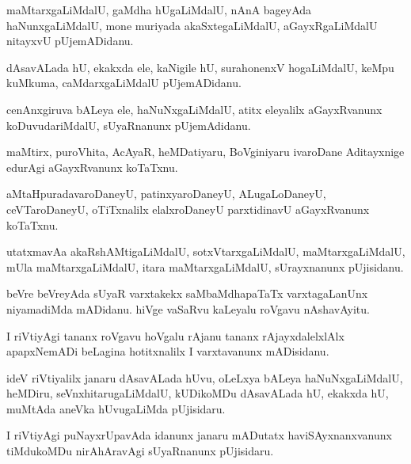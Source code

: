 \documentclass{article}
\begin{document}
\begin{mng}%
maMtarxgaLiMdalU, gaMdha hUgaLiMdalU, nAnA bageyAda haNunxgaLiMdalU, mone muriyada 
akaSxtegaLiMdalU, aGayxRgaLiMdalU nitayxvU pUjemADidanu.
\end{mng}

\begin{mng}%
dAsavALada hU, ekakxda ele, kaNigile hU, surahonenxV hogaLiMdalU, keMpu kuMkuma, caMdarxgaLiMdalU 
pUjemADidanu.
\end{mng}

\begin{mng}%
cenAnxgiruva bALeya ele, haNuNxgaLiMdalU, atitx eleyalilx aGayxRvanunx koDuvudariMdalU, 
sUyaRnanunx pUjemAdidanu.
\end{mng}

\begin{mng}%
maMtirx, puroVhita, AcAyaR, heMDatiyaru, BoVginiyaru ivaroDane Aditayxnige edurAgi aGayxRvanunx 
koTaTxnu.
\end{mng}

\begin{mng}%
aMtaHpuradavaroDaneyU, patinxyaroDaneyU, ALugaLoDaneyU, ceVTaroDaneyU, oTiTxnalilx elalxroDaneyU 
parxtidinavU aGayxRvanunx koTaTxnu.
\end{mng}

\begin{mng}%
utatxmavAa akaRshAMtigaLiMdalU, sotxVtarxgaLiMdalU, maMtarxgaLiMdalU, mUla maMtarxgaLiMdalU, itara 
maMtarxgaLiMdalU, sUrayxnanunx pUjisidanu.
\end{mng}

\begin{mng}%
beVre beVreyAda sUyaR varxtakekx saMbaMdhapaTaTx varxtagaLanUnx niyamadiMda mADidanu. hiVge 
vaSaRvu kaLeyalu roVgavu nAshavAyitu.
\end{mng}

\begin{mng}%
I riVtiyAgi tananx roVgavu hoVgalu rAjanu tananx rAjayxdalelxlAlx apapxNemADi beLagina 
hotitxnalilx I varxtavanunx mADisidanu.
\end{mng}

\begin{mng}%
ideV riVtiyalilx janaru dAsavALada hUvu, oLeLxya bALeya haNuNxgaLiMdalU, heMDiru, 
seVnxhitarugaLiMdalU, kUDikoMDu dAsavALada hU, ekakxda hU, muMtAda aneVka hUvugaLiMda pUjisidaru.
\end{mng}

\begin{mng}%
I riVtiyAgi puNayxrUpavAda idanunx janaru mADutatx haviSAyxnanxvanunx tiMdukoMDu nirAhAravAgi 
sUyaRnanunx pUjisidaru.
\end{mng}
\end{document}
